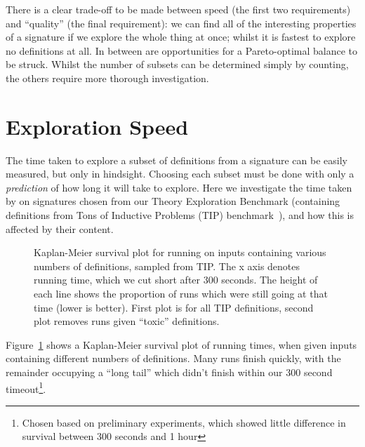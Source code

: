 There is a clear trade-off to be made between speed (the first two requirements)
and ``quality'' (the final requirement): we can find all of the interesting
properties of a signature if we explore the whole thing at once; whilst it
is fastest to explore no definitions at all. In between are opportunities for a
Pareto-optimal balance to be struck. Whilst the number of subsets can be
determined simply by counting, the others require more thorough investigation.

\section{Exploration Speed}

The time taken to explore a subset of definitions from a signature can be easily
measured, but only in hindsight. Choosing each subset must be done with only a
\emph{prediction} of how long it will take to explore. Here we investigate the
time taken by \quickspec{} on signatures chosen from our Theory Exploration
Benchmark (containing definitions from Tons of Inductive Problems (TIP)
benchmark~\cite{claessen2015tip}), and how this is affected by their content.

\begin{figure}
  \centering
  \scalebox{0.66}{}
  \scalebox{0.66}{}
  \scalebox{0.66}{}
  \scalebox{0.66}{}
  \caption{Kaplan-Meier survival plot for running \quickspec{} on inputs
    containing various numbers of definitions, sampled from TIP. The x axis
    denotes running time, which we cut short after 300 seconds. The height of
    each line shows the proportion of \quickspec{} runs which were still going
    at that time (lower is better). First plot is for all TIP definitions,
    second plot removes runs given ``toxic'' definitions.
    \iffalse
    TODO: Alison: The key needs further explanation (either here or in the caption)
    TODO: Alison: Label the y axis (on both)
    \fi}
  \label{fig:survival}
\end{figure}

Figure~\ref{fig:survival} shows a Kaplan-Meier survival plot of \quickspec{}
running times, when given inputs containing different numbers of definitions.
Many runs finish quickly, with the remainder occupying a ``long tail'' which
didn't finish within our 300 second timeout\footnote{Chosen based on preliminary
  experiments, which showed little difference in survival between 300 seconds
  and 1 hour}.

